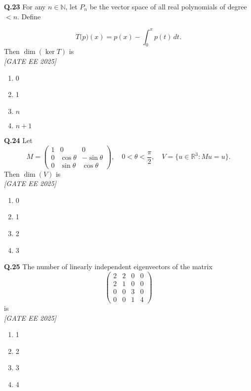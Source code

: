 \documentclass[11pt]{article}
\begin{document}
\vspace{0.5cm}

\noindent\textbf{Q.23}  
For any \(n \in \mathbb{N}\), let \(P_n\) be the vector space of all real polynomials of degree $< n$. Define

\[
T\bigl(p\bigr)(x) = p(x) - \int_{0}^{x} p(t)\,dt.
\]
Then \(\dim(\ker T)\) is  
\\[1ex] \textit{[GATE EE 2025]}

\begin{enumerate}[label=(\Alph*)]

\item 0 \item 1 \item \(n\) \item \(n+1\)
\end{enumerate}

\vspace{0.5cm}

\noindent\textbf{Q.24}  
Let  
\[
M = \begin{pmatrix}
1 & 0 & 0 \\
0 & \cos\theta & -\sin\theta \\
0 & \sin\theta & \cos\theta
\end{pmatrix}, \quad 0 < \theta < \frac{\pi}{2}, \quad
V = \{ u \in \mathbb{R}^3 : Mu = u \}.
\]
Then \(\dim(V)\) is  
\\[1ex] \textit{[GATE EE 2025]}

\begin{enumerate}[label=(\Alph*)]

\item 0 \item 1 \item 2 \item 3
\end{enumerate}

\vspace{0.5cm}

\noindent\textbf{Q.25}  
The number of linearly independent eigenvectors of the matrix  
\[
\begin{pmatrix}
2 & 2 & 0 & 0 \\
2 & 1 & 0 & 0 \\
0 & 0 & 3 & 0 \\
0 & 0 & 1 & 4
\end{pmatrix}
\]
is  
\\[1ex] \textit{[GATE EE 2025]}

\begin{enumerate}[label=(\Alph*)]

\item 1 \item 2 \item 3 \item 4
\end{enumerate}
\end{document}
